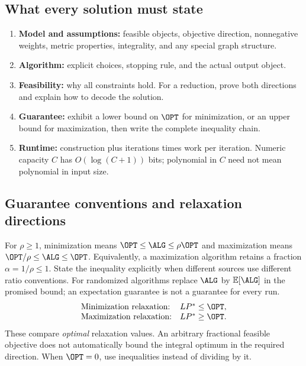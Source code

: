 \subsection{What every solution must state}
\begin{enumerate}
\item \textbf{Model and assumptions:} feasible objects, objective direction, nonnegative
weights, metric properties, integrality, and any special graph structure.
\item \textbf{Algorithm:} explicit choices, stopping rule, and the actual output object.
\item \textbf{Feasibility:} why all constraints hold. For a reduction, prove both directions
and explain how to decode the solution.
\item \textbf{Guarantee:} exhibit a lower bound on $\OPT$ for minimization, or an upper
bound for maximization, then write the complete inequality chain.
\item \textbf{Runtime:} construction plus iterations times work per iteration. Numeric
capacity $C$ has $O(\log(C+1))$ bits; polynomial in $C$ need not mean polynomial in input size.
\end{enumerate}

\subsection{Guarantee conventions and relaxation directions}
For $\rho\ge1$, minimization means $\OPT\le\ALG\le\rho\OPT$ and maximization means
$\OPT/\rho\le\ALG\le\OPT$. Equivalently, a maximization algorithm retains a fraction
$\alpha=1/\rho\le1$. State the inequality explicitly when different sources use different
ratio conventions. For randomized algorithms replace $\ALG$ by $\mathbb E[\ALG]$ in the
promised bound; an expectation guarantee is not a guarantee for every run.
\[
\begin{array}{ll}
\text{Minimization relaxation:}&LP^*\le\OPT,\\
\text{Maximization relaxation:}&LP^*\ge\OPT.
\end{array}
\]
These compare \emph{optimal} relaxation values. An arbitrary fractional feasible objective
does not automatically bound the integral optimum in the required direction. When $\OPT=0$,
use inequalities instead of dividing by it.

